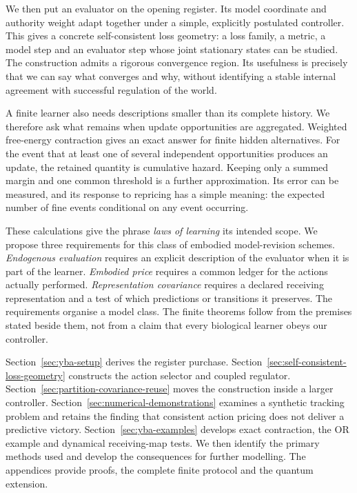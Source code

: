 We then put an evaluator on the opening register. Its model coordinate and authority weight adapt together under a simple, explicitly postulated controller. This gives a concrete self-consistent loss geometry: a loss family, a metric, a model step and an evaluator step whose joint stationary states can be studied. The construction admits a rigorous convergence region. Its usefulness is precisely that we can say what converges and why, without identifying a stable internal agreement with successful regulation of the world.

A finite learner also needs descriptions smaller than its complete history. We therefore ask what remains when update opportunities are aggregated. Weighted free-energy contraction gives an exact answer for finite hidden alternatives. For the event that at least one of several independent opportunities produces an update, the retained quantity is cumulative hazard. Keeping only a summed margin and one common threshold is a further approximation. Its error can be measured, and its response to repricing has a simple meaning: the expected number of fine events conditional on any event occurring.

These calculations give the phrase \emph{laws of learning} its intended scope. We propose three requirements for this class of embodied model-revision schemes. \emph{Endogenous evaluation} requires an explicit description of the evaluator when it is part of the learner. \emph{Embodied price} requires a common ledger for the actions actually performed. \emph{Representation covariance} requires a declared receiving representation and a test of which predictions or transitions it preserves. The requirements organise a model class. The finite theorems follow from the premises stated beside them, not from a claim that every biological learner obeys our controller.

Section~\ref{sec:yba-setup} derives the register purchase. Section~\ref{sec:self-consistent-loss-geometry} constructs the action selector and coupled regulator. Section~\ref{sec:partition-covariance-reuse} moves the construction inside a larger controller. Section~\ref{sec:numerical-demonstrations} examines a synthetic tracking problem and retains the finding that consistent action pricing does not deliver a predictive victory. Section~\ref{sec:yba-examples} develops exact contraction, the OR example and dynamical receiving-map tests. We then identify the primary methods used and develop the consequences for further modelling. The appendices provide proofs, the complete finite protocol and the quantum extension.
